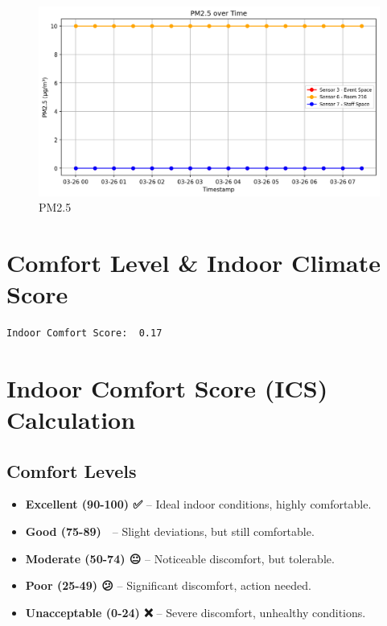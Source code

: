 \documentclass[
  12pt,
  letterpaper,
]{article}
\providecommand{\tightlist}{%
  \setlength{\itemsep}{0pt}\setlength{\parskip}{0pt}}\usepackage{longtable,booktabs,array}
\begin{document}
\begin{figure}[H]

{\centering \includegraphics[width=0.85\linewidth,height=\textheight,keepaspectratio]{./charts/pm_chart.png}

}

\caption{PM2.5}

\end{figure}%

\section{Comfort Level \& Indoor Climate
Score}\label{comfort-level-indoor-climate-score}

\begin{verbatim}
Indoor Comfort Score:  0.17
\end{verbatim}

\section{\texorpdfstring{\textbf{Indoor Comfort Score (ICS)
Calculation}}{Indoor Comfort Score (ICS) Calculation}}\label{indoor-comfort-score-ics-calculation}

\subsection{\texorpdfstring{\textbf{Comfort
Levels}}{Comfort Levels}}\label{comfort-levels}

\begin{itemize}
\tightlist
\item
  \textbf{Excellent (90-100) ✅} -- Ideal indoor conditions, highly
  comfortable.\\
\item
  \textbf{Good (75-89) 🙂} -- Slight deviations, but still
  comfortable.\\
\item
  \textbf{Moderate (50-74) 😐} -- Noticeable discomfort, but
  tolerable.\\
\item
  \textbf{Poor (25-49) 😕} -- Significant discomfort, action needed.\\
\item
  \textbf{Unacceptable (0-24) ❌} -- Severe discomfort, unhealthy
  conditions.
\end{itemize}
\end{document}

